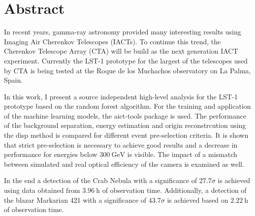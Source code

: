 \thispagestyle{plain}

\section*{Abstract}
In recent years, gamma-ray astronomy provided many interesting results using Imaging Air Cherenkov Telescopes (IACTs).
To continue this trend, the Cherenkov Telescope Array (CTA) will be build as the next generation IACT experiment.
Currently the LST-1 prototype for the largest of the telescopes used by CTA is being tested at the Roque de los Muchachos observatory on La Palma, Spain.

In this work, I present a source independent high-level analysis for the LST-1 prototype based on the random forest algorithm.
For the training and application of the machine learning models, the aict-tools package is used.
The performance of the background separation, energy estimation and origin reconstrcution using the disp method is compared for 
different event pre-selection criteria.
It is shown that strict pre-selection is necessary to achieve good results and a decrease in performance for energies below $\SI{300}{\giga\electronvolt}$
is visible.
The impact of a mismatch between simulated and real optical efficiency of the camera is examined as well.

In the end a detection of the Crab Nebula with a significance of $\num{27.7} \sigma$ is achieved using data obtained from $\SI{3.96}{\hour}$ of observation time.
Additionally, a detection of the blazar Markarian 421 with a significance of $\num{43.7} \sigma$ is achieved based on $\SI{2.22}{\hour}$ of observation time.
